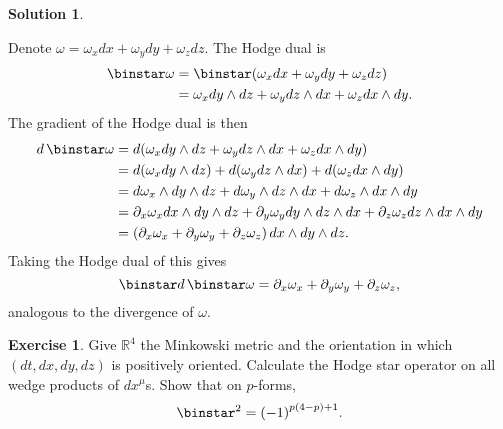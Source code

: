 \documentclass[11pt, a4paper]{report}
\theoremstyle{definition}
\newtheorem{exercise}{Exercise}[part]
\newtheorem{solution}{Solution}[part]
\newenvironment{ex}{\begin{exercise}}{\end{exercise}\pagebreak[1]}
\newenvironment{sol}{\begin{solution}}{\end{solution}\pagebreak[3]}
\newcommand*{\op}[1]{\ensuremath\mathop{}\mathopen{}#1}
\renewcommand*{\d}{\op{d}}
\renewcommand*{\star}{\op{\binstar}\mathord{}}
\begin{document}
\begin{sol}\label{sol:divergence1form}

Denote $\omega = \omega_x dx + \omega_y dy + \omega_z dz$. The Hodge dual is
\begin{align*}
    \star \omega &= \star (\omega_x dx + \omega_y dy + \omega_z dz) \\
        &= \omega_x dy \wedge dz + \omega_y dz \wedge dx + \omega_z dx \wedge dy.
\end{align*}
The gradient of the Hodge dual is then
\begin{align*}
    d \star \omega &= d(\omega_x dy \wedge dz + \omega_y dz \wedge dx + \omega_z dx \wedge dy) \\
        &= d(\omega_x dy \wedge dz) + d(\omega_y dz \wedge dx) + d(\omega_z dx \wedge dy) \\
        &= d\omega_x \wedge dy \wedge dz + d\omega_y \wedge dz \wedge dx + d\omega_z \wedge dx \wedge dy \\
        &= \partial_x \omega_x dx \wedge dy \wedge dz + \partial_y \omega_y dy \wedge dz \wedge dx + \partial_z \omega_z dz \wedge dx \wedge dy \\
        &= (\partial_x \omega_x + \partial_y \omega_y + \partial_z \omega_z) \d x \wedge dy \wedge dz.
\end{align*}
Taking the Hodge dual of this gives
\[
    \star d \star \omega = \partial_x \omega_x + \partial_y \omega_y + \partial_z \omega_z,
\]
analogous to the divergence of $\omega$.

\end{sol}

\begin{ex}

Give $\mathbb{R}^4$ the Minkowski metric and the orientation in which $(dt, dx, dy, dz)$ is positively oriented. Calculate the Hodge star operator on all wedge products of $dx^\mu$s. Show that on $p$-forms,
\[
    \star^2 = {(-1)}^{p (4 - p) + 1}.
\]

\end{ex}
\end{document}
